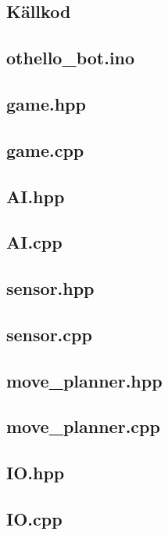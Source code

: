 \documentclass[a4paper]{article}
\begin{document}
\pagebreak
\begin{appendix}
\section{Källkod}
\subsection{othello\_bot.ino}

\subsection{game.hpp}

\subsection{game.cpp}

\subsection{AI.hpp}

\subsection{AI.cpp}

\subsection{sensor.hpp}

\subsection{sensor.cpp}

\subsection{move\_planner.hpp}

\subsection{move\_planner.cpp}

\subsection{IO.hpp}

\subsection{IO.cpp}


\end{appendix}
\end{document}
